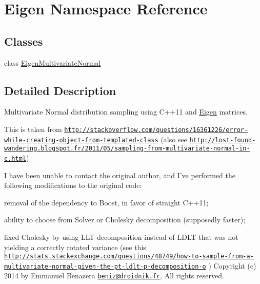 \hypertarget{namespaceEigen}{\section{Eigen Namespace Reference}
\label{namespaceEigen}
}
\subsection*{Classes}
\begin{DoxyCompactItemize}
\item 
class \hyperlink{classEigen_1_1EigenMultivariateNormal}{Eigen\+Multivariate\+Normal}
\end{DoxyCompactItemize}


\subsection{Detailed Description}
Multivariate Normal distribution sampling using C++11 and \hyperlink{namespaceEigen}{Eigen} matrices.

This is taken from \href{http://stackoverflow.com/questions/16361226/error-while-creating-object-from-templated-class}{\tt http\+://stackoverflow.\+com/questions/16361226/error-\/while-\/creating-\/object-\/from-\/templated-\/class} (also see \href{http://lost-found-wandering.blogspot.fr/2011/05/sampling-from-multivariate-normal-in-c.html}{\tt http\+://lost-\/found-\/wandering.\+blogspot.\+fr/2011/05/sampling-\/from-\/multivariate-\/normal-\/in-\/c.\+html})

I have been unable to contact the original author, and I've performed the following modifications to the original code\+:
\begin{DoxyItemize}
\item removal of the dependency to Boost, in favor of straight C++11;
\item ability to choose from Solver or Cholesky decomposition (supposedly faster);
\item fixed Cholesky by using L\+L\+T decomposition instead of L\+D\+L\+T that was not yielding a correctly rotated variance (see this \href{http://stats.stackexchange.com/questions/48749/how-to-sample-from-a-multivariate-normal-given-the-pt-ldlt-p-decomposition-o}{\tt http\+://stats.\+stackexchange.\+com/questions/48749/how-\/to-\/sample-\/from-\/a-\/multivariate-\/normal-\/given-\/the-\/pt-\/ldlt-\/p-\/decomposition-\/o} ) Copyright (c) 2014 by Emmanuel Benazera \href{mailto:beniz@droidnik.fr}{\tt beniz@droidnik.\+fr}, All rights reserved.
\end{DoxyItemize}

